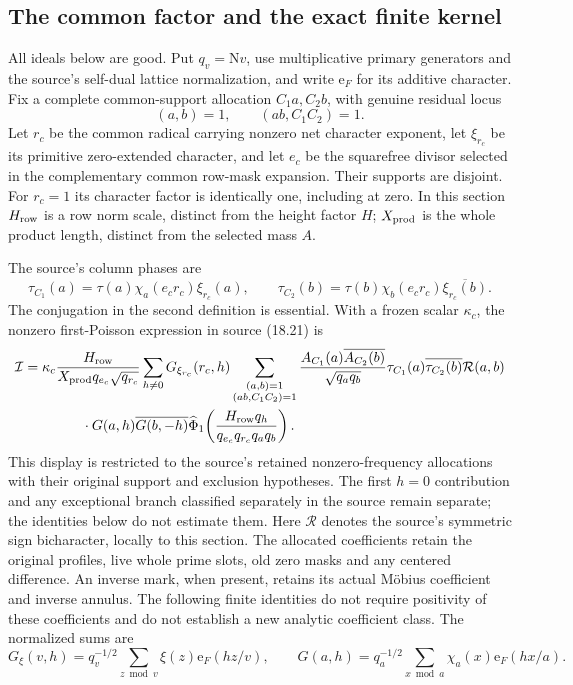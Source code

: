 \documentclass[11pt]{article}
\theoremstyle{definition}
\newcommand{\N}{\mathrm N}
\begin{document}
\subsection{The common factor and the exact finite kernel}
All ideals below are good.  Put $q_v=\N v$, use multiplicative primary
generators and the source's self-dual lattice normalization, and write
$\mathrm e_F$ for its additive character.  Fix a complete common-support
allocation $C_1a,C_2b$, with genuine residual locus
\begin{equation}\label{sj-genuine-locus}
 (a,b)=1,\qquad (ab,C_1C_2)=1.
\end{equation}
Let $r_c$ be the common radical carrying nonzero net character exponent,
let $\xi_{r_c}$ be its primitive zero-extended character, and let $e_c$ be
the squarefree divisor selected in the complementary common row-mask
expansion.  Their supports are disjoint.  For $r_c=1$ its character factor
is identically one, including at zero.  In this section $H_{\rm row}$ is
a row norm scale, distinct from the height factor $H$; $X_{\rm prod}$ is
the whole product length, distinct from the selected mass $A$.

The source's column phases are
\begin{equation}\label{sj-column-phases}
 \tau_{C_1}(a)=\tau(a)\chi_a(e_cr_c)\xi_{r_c}(a),\qquad
 \tau_{C_2}(b)=\tau(b)\chi_b(e_cr_c)\overline{\xi_{r_c}(b)}.
\end{equation}
The conjugation in the second definition is essential.  With a frozen
scalar $\kappa_c$, the nonzero first-Poisson expression in source (18.21)
is
\begin{align}\label{sj-first-expression}
 \mathcal I={}&\kappa_c
 \frac{H_{\rm row}}{X_{\rm prod}q_{e_c}\sqrt{q_{r_c}}}
 \sum_{h\ne0}G_{\xi_{r_c}}(r_c,h)
 \sum_{\substack{(a,b)=1\\(ab,C_1C_2)=1}}
 \frac{A_{C_1}(a)\overline{A_{C_2}(b)}}{\sqrt{q_aq_b}}
 \tau_{C_1}(a)\overline{\tau_{C_2}(b)}\mathcal R(a,b)\notag\\
 &\hspace{10mm}\cdot G(a,h)\overline{G(b,-h)}
 \widehat\Phi_1\!\left(
 \frac{H_{\rm row}q_h}{q_{e_c}q_{r_c}q_aq_b}\right).
\end{align}
This display is restricted to the source's retained nonzero-frequency
allocations with their original support and exclusion hypotheses.  The
first $h=0$ contribution and any exceptional branch classified separately
in the source remain separate; the identities below do not estimate them.
Here $\mathcal R$ denotes the source's symmetric sign bicharacter,
locally to this section.  The allocated coefficients retain the original
profiles, live whole prime slots, old zero masks and any centered difference.
An inverse mark, when present, retains its actual M\"obius coefficient and
inverse annulus.  The following finite identities do not require positivity
of these coefficients and do not establish a new analytic coefficient class.
The normalized sums are
\[
 G_\xi(v,h)=q_v^{-1/2}\sum_{z\bmod v}\xi(z)\mathrm e_F(hz/v),
 \qquad G(a,h)=q_a^{-1/2}\sum_{x\bmod a}
                  \chi_a(x)\mathrm e_F(hx/a).
\]
\end{document}
